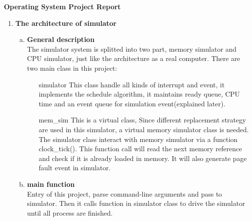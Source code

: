 \documentclass[12pt,a4paper]{article}
\begin{document}
	\begin{center}
		\begin{Large}\bf Operating System Project Report
		\end{Large}
	\end{center}

	\begin{enumerate}[\bf I]
		\item \textbf{The architecture  of  simulator}
			\begin{enumerate}[a)]
				\item \textbf{General description}\\ The simulator system is splitted into two part, memory simulator and CPU simulator, just like the architecture as a real computer. There are two main class in this project:
				\begin{enumerate}
					\item[simulator] This class handle all kinds of interrupt and event, it implements the schedule algorithm, it maintains ready queue, CPU time and an event queue for simulation event(explained later).
					\item[mem\_sim] This is a virtual class, Since different replacement strategy are used in this simulator, a virtual memory simulator class is needed. The simulator class interact with memory simulator via a function clock\_tick(). This function call will read the next memory reference and check if it is already loaded in memory. It will also generate page fault event in simulator.
				\end{enumerate}
				
				\item \textbf{main function}\\
					Entry of this project, parse command-line arguments and pass to simulator. Then it calls function in simulator class to drive the simulator until all process are finished.
					

\end{enumerate}
\end{enumerate}
\end{document}
